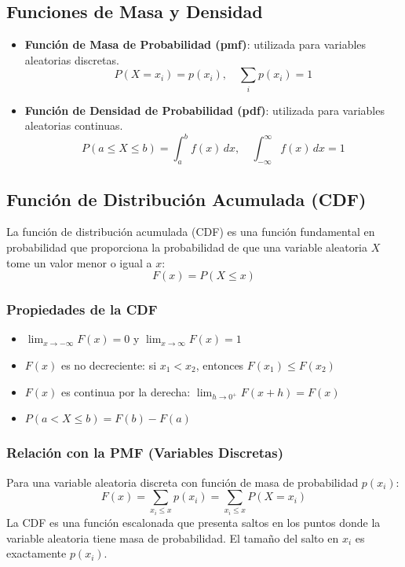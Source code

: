 \documentclass[12pt,a4paper]{article}
\begin{document}
\subsection{Funciones de Masa y Densidad}
\begin{itemize}
    \item \textbf{Función de Masa de Probabilidad (pmf)}: utilizada para variables aleatorias discretas. 
    \begin{equation}
        P(X = x_i) = p(x_i), \quad \sum_i p(x_i) = 1
    \end{equation}
    \item \textbf{Función de Densidad de Probabilidad (pdf)}: utilizada para variables aleatorias continuas. 
    \begin{equation}
        P(a \leq X \leq b) = \int_a^b f(x)\, dx, \quad \int_{-\infty}^{\infty} f(x)\, dx = 1
    \end{equation}
\end{itemize}

\subsection{Función de Distribución Acumulada (CDF)}
La función de distribución acumulada (CDF) es una función fundamental en probabilidad que proporciona la probabilidad de que una variable aleatoria $X$ tome un valor menor o igual a $x$:
\begin{equation}
    F(x) = P(X \leq x)
\end{equation}

\subsubsection{Propiedades de la CDF}
\begin{itemize}
    \item $\lim_{x \to -\infty} F(x) = 0$ y $\lim_{x \to \infty} F(x) = 1$
    \item $F(x)$ es no decreciente: si $x_1 < x_2$, entonces $F(x_1) \leq F(x_2)$
    \item $F(x)$ es continua por la derecha: $\lim_{h \to 0^+} F(x+h) = F(x)$
    \item $P(a < X \leq b) = F(b) - F(a)$
\end{itemize}

\subsubsection{Relación con la PMF (Variables Discretas)}
Para una variable aleatoria discreta con función de masa de probabilidad $p(x_i)$:
\begin{equation}
    F(x) = \sum_{x_i \leq x} p(x_i) = \sum_{x_i \leq x} P(X = x_i)
\end{equation}
La CDF es una función escalonada que presenta saltos en los puntos donde la variable aleatoria tiene masa de probabilidad. El tamaño del salto en $x_i$ es exactamente $p(x_i)$.
\end{document}
